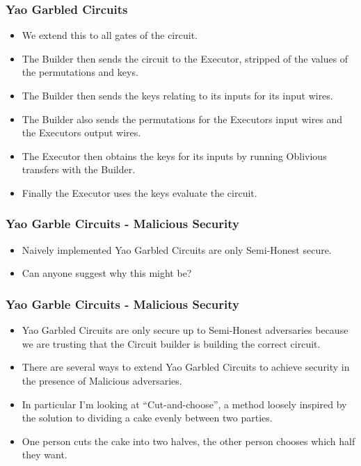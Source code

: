 \documentclass{beamer}
\begin{document}
	\begin{frame}
		\frametitle{Yao Garbled Circuits}
		\begin{itemize}
			\item We extend this to all gates of the circuit.
			\item The Builder then sends the circuit to the Executor, stripped of the values of the permutations and keys.
			\item The Builder then sends the keys relating to its inputs for its input wires.
			\item The Builder also sends the permutations for the Executors input wires and the Executors output wires.
			\item The Executor then obtains the keys for its inputs by running Oblivious transfers with the Builder.
			\item Finally the Executor uses the keys evaluate the circuit.
		\end{itemize}
	\end{frame}

	
	\begin{frame}
		\frametitle{Yao Garble Circuits - Malicious Security}
		\begin{itemize}
			\item Naively implemented Yao Garbled Circuits are only Semi-Honest secure.
			\item Can anyone suggest why this might be?
		\end{itemize}
	\end{frame}

	
	\begin{frame}
		\frametitle{Yao Garble Circuits - Malicious Security}
		\begin{itemize}
			\item Yao Garbled Circuits are only secure up to Semi-Honest adversaries because we are trusting that the Circuit builder is building the correct circuit.
			\item There are several ways to extend Yao Garbled Circuits to achieve security in the presence of Malicious adversaries.
			\item In particular I'm looking at ``Cut-and-choose'', a method loosely inspired by the solution to dividing a cake evenly between two parties.
			\item One person cuts the cake into two halves, the other person chooses which half they want.
		\end{itemize}

	\end{frame}
\end{document}
